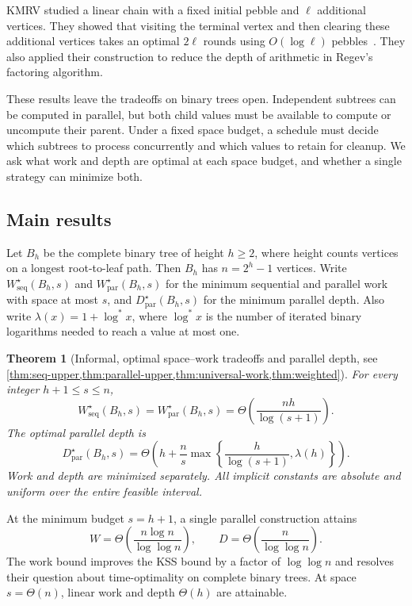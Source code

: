 \documentclass[11pt]{article}
\newtheorem{theorem}{Theorem}[section]
\theoremstyle{definition}
\theoremstyle{remark}
\newcommand{\Wseq}{W_{\mathrm{seq}}}
\newcommand{\Wpar}{W_{\mathrm{par}}}
\newcommand{\Dpar}{D_{\mathrm{par}}}
\begin{document}
KMRV studied a linear chain with a fixed initial pebble and $\ell$
additional vertices. They showed that visiting the terminal vertex
and then clearing these additional vertices takes an optimal $2\ell$
rounds using $O(\log\ell)$ pebbles~\cite{KMRV2026}. They also applied
their construction to reduce the depth of arithmetic in Regev's
factoring algorithm.

These results leave the tradeoffs on binary trees open. Independent subtrees can be computed in parallel, but both child values must be available to compute or uncompute their parent. Under a fixed space budget, a schedule must decide which subtrees to process concurrently and which values to retain for cleanup. We ask what work and depth are optimal at each space budget, and whether a single strategy can minimize both.

\subsection{Main results}

Let $B_h$ be the complete binary tree of height $h\ge2$, where height counts vertices on a longest root-to-leaf path. Then $B_h$ has $n=2^h-1$ vertices. Write $\Wseq^\star(B_h,s)$ and $\Wpar^\star(B_h,s)$ for the minimum sequential and parallel work with space at most $s$, and $\Dpar^\star(B_h,s)$ for the minimum parallel depth. Also write $\lambda(x)=1+\log^*x$, where $\log^*x$ is the number of iterated binary logarithms needed to reach a value at most one.

\begin{theorem}[Informal, optimal space--work tradeoffs and parallel depth,
see \cref{thm:seq-upper,thm:parallel-upper,thm:universal-work,thm:weighted}]
\label{thm:main}
For every integer $h+1\le s\le n$,
\begin{equation}
    \Wseq^\star(B_h,s)=\Wpar^\star(B_h,s)=\Theta\!\left(\frac{nh}{\log(s+1)}\right).
    \label{eq:main-work}
\end{equation}
The optimal parallel depth is
\begin{equation}
    \Dpar^\star(B_h,s)=\Theta\!\left(h+\frac ns\max\!\left\{\frac{h}{\log(s+1)},\lambda(h)\right\}\right).
    \label{eq:main-depth}
\end{equation}
Work and depth are minimized separately. All implicit constants are absolute and uniform over the entire feasible interval.
\end{theorem}


At the minimum budget $s=h+1$, a single parallel construction attains
\begin{equation}
    W=\Theta\!\left(\frac{n\log n}{\log\log n}\right), \qquad D=\Theta\!\left(\frac n{\log\log n}\right).
    \label{eq:min-space}
\end{equation}
The work bound improves the KSS bound by a factor of $\log\log n$ and resolves their question about time-optimality on complete binary trees. At space $s=\Theta(n)$, linear work and depth $\Theta(h)$ are attainable.
\end{document}
